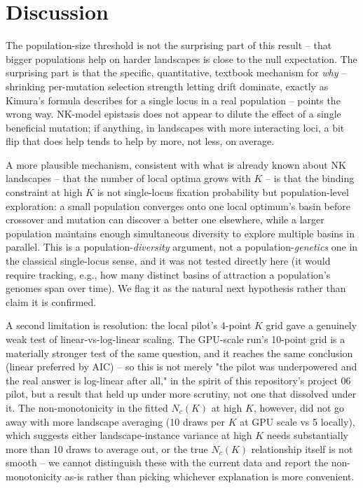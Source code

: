 \section{Discussion}

The population-size threshold is not the surprising part of this result --
that bigger populations help on harder landscapes is close to the null
expectation. The surprising part is that the specific, quantitative,
textbook mechanism for \emph{why} -- shrinking per-mutation selection
strength letting drift dominate, exactly as Kimura's formula describes for
a single locus in a real population -- points the wrong way. NK-model
epistasis does not appear to dilute the effect of a single beneficial
mutation; if anything, in landscapes with more interacting loci, a bit
flip that does help tends to help by more, not less, on average.

A more plausible mechanism, consistent with what is already known about
NK landscapes -- that the number of local optima grows with $K$
\cite{kauffman1987towards,weinberger1991local} -- is that the binding
constraint at high $K$ is not single-locus fixation probability but
population-level exploration: a small population converges onto one local
optimum's basin before crossover and mutation can discover a better one
elsewhere, while a larger population maintains enough simultaneous
diversity to explore multiple basins in parallel. This is a
population-\emph{diversity} argument, not a population-\emph{genetics}
one in the classical single-locus sense, and it was not tested directly
here (it would require tracking, e.g., how many distinct basins of
attraction a population's genomes span over time). We flag it as the
natural next hypothesis rather than claim it is confirmed.

A second limitation is resolution: the local pilot's 4-point $K$ grid gave
a genuinely weak test of linear-vs-log-linear scaling. The GPU-scale run's
10-point grid is a materially stronger test of the same question, and it
reaches the same conclusion (linear preferred by AIC) -- so this is not
merely "the pilot was underpowered and the real answer is log-linear
after all," in the spirit of this repository's project 06 pilot, but a
result that held up under more scrutiny, not one that dissolved under it.
The non-monotonicity in the fitted $N_c(K)$ at high $K$, however, did not
go away with more landscape averaging (10 draws per $K$ at GPU scale vs 5
locally), which suggests either landscape-instance variance at high $K$
needs substantially more than 10 draws to average out, or the true
$N_c(K)$ relationship itself is not smooth -- we cannot distinguish these
with the current data and report the non-monotonicity as-is rather than
picking whichever explanation is more convenient.
